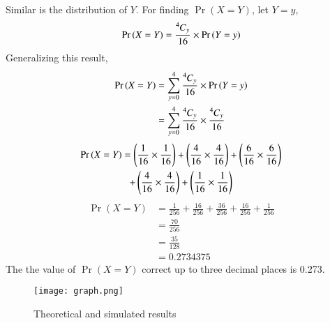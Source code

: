 \documentclass[journal,12pt,twocolumn]{IEEEtran}
\begin{document}
Similar is the distribution of $Y$. For finding $\Pr{(X=Y)}$, let $Y=y$,
\begin{align}
    \Pr{(X=Y)} = \frac{\comb[4]{y}}{16} \times \Pr{(Y=y)}
\end{align}
Generalizing this result,
\begin{align}
    \Pr{(X=Y)} &= \sum_{y=0}^4  \frac{\comb[4]{y}}{16}\times \Pr{(Y=y)}
    \\ &= \sum_{y=0}^4 \frac{\comb[4]{y}}{16} \times \frac{\comb[4]{y}}{16}
\end{align}
\begin{multline}
    \Pr{(X=Y)} = \brak{\frac{1}{16}\times\frac{1}{16}} + \brak{\frac{4}{16}\times\frac{4}{16}} +\brak{\frac{6}{16}\times\frac{6}{16}} \\+\brak{\frac{4}{16}\times\frac{4}{16}} +\brak{\frac{1}{16}\times\frac{1}{16}} 
\end{multline}
\begin{align}
    \Pr{(X=Y)} &= \frac{1}{256} + \frac{16}{256} +\frac{36}{256} +\frac{16}{256} +\frac{1}{256} 
    \\&= \frac{70}{256} 
    \\&= \frac{35}{128} 
    \\&= 0.2734375
\end{align}
The the value of $\Pr{(X=Y)}$ correct up to three decimal places is 0.273.
\begin{figure} [H]
    \texttt{[image: graph.png]}
    \caption{Theoretical and simulated results}
    \label{Fig 1}
\end{figure}
\end{document}
